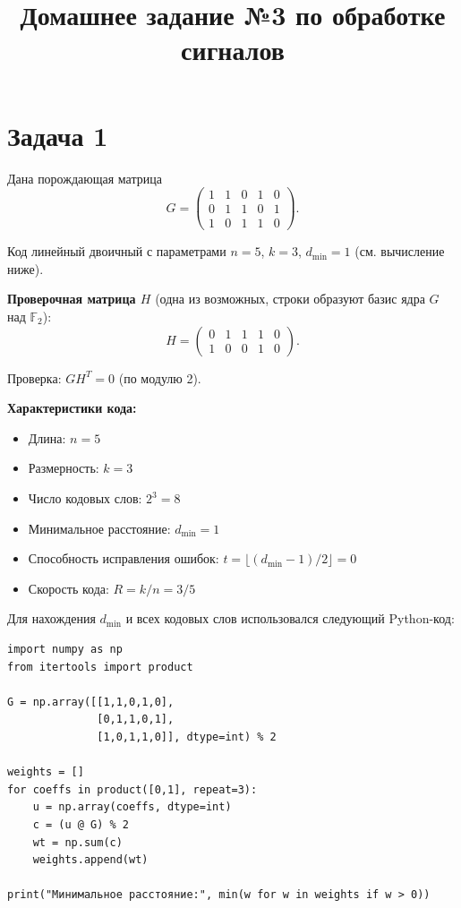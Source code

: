 \documentclass{article}
\begin{document}
\title{Домашнее задание №3 по обработке сигналов}
\author{}
\date{}
\maketitle

\section{Задача 1}

Дана порождающая матрица
\[
G = \begin{pmatrix}
1 & 1 & 0 & 1 & 0 \\
0 & 1 & 1 & 0 & 1 \\
1 & 0 & 1 & 1 & 0
\end{pmatrix}.
\]

Код линейный двоичный с параметрами $n=5$, $k=3$, $d_{\min}=1$ (см. вычисление ниже).

\textbf{Проверочная матрица $H$} (одна из возможных, строки образуют базис ядра $G$ над $\mathbb{F}_2$):
\[
H = \begin{pmatrix}
0 & 1 & 1 & 1 & 0 \\
1 & 0 & 0 & 1 & 0
\end{pmatrix}.
\]

Проверка: $G H^T = 0$ (по модулю 2).

\textbf{Характеристики кода:}
\begin{itemize}
\item Длина: $n=5$
\item Размерность: $k=3$
\item Число кодовых слов: $2^3=8$
\item Минимальное расстояние: $d_{\min}=1$
\item Способность исправления ошибок: $t = \lfloor (d_{\min}-1)/2 \rfloor = 0$
\item Скорость кода: $R = k/n = 3/5$
\end{itemize}

Для нахождения $d_{\min}$ и всех кодовых слов использовался следующий Python-код:

\begin{verbatim}
import numpy as np
from itertools import product

G = np.array([[1,1,0,1,0],
              [0,1,1,0,1],
              [1,0,1,1,0]], dtype=int) % 2

weights = []
for coeffs in product([0,1], repeat=3):
    u = np.array(coeffs, dtype=int)
    c = (u @ G) % 2
    wt = np.sum(c)
    weights.append(wt)

print("Минимальное расстояние:", min(w for w in weights if w > 0))
\end{verbatim}
\end{document}
